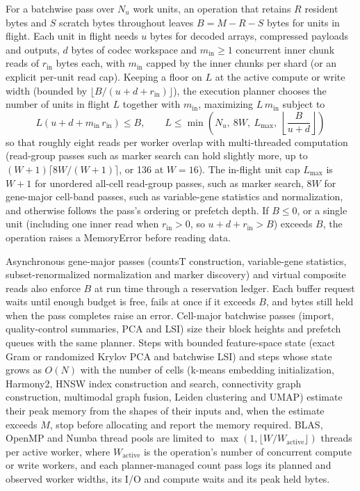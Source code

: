 \documentclass[11pt]{article}
\begin{document}
For a batchwise pass over $N_u$ work units, an operation that retains $R$ resident bytes and $S$ scratch bytes throughout leaves $B=M-R-S$ bytes for units in flight. Each unit in flight needs $u$ bytes for decoded arrays, compressed payloads and outputs, $d$ bytes of codec workspace and $m_{\mathrm{in}}\ge1$ concurrent inner chunk reads of $r_{\mathrm{in}}$ bytes each, with $m_{\mathrm{in}}$ capped by the inner chunks per shard (or an explicit per-unit read cap). Keeping a floor on $L$ at the active compute or write width (bounded by $\lfloor B/(u+d+r_{\mathrm{in}})\rfloor$), the execution planner chooses the number of units in flight $L$ together with $m_{\mathrm{in}}$, maximizing $L\,m_{\mathrm{in}}$ subject to
\[
L\left(u+d+m_{\mathrm{in}}\,r_{\mathrm{in}}\right)\le B,\qquad L\le\min\left(N_u,\ 8W,\ L_{\max},\ \left\lfloor\frac{B}{u+d}\right\rfloor\right)
\]
so that roughly eight reads per worker overlap with multi-threaded computation (read-group passes such as marker search can hold slightly more, up to $(W+1)\lceil 8W/(W+1)\rceil$, or 136 at $W=16$). The in-flight unit cap $L_{\max}$ is $W+1$ for unordered all-cell read-group passes, such as marker search, $8W$ for gene-major cell-band passes, such as variable-gene statistics and normalization, and otherwise follows the pass's ordering or prefetch depth. If $B\le0$, or a single unit (including one inner read when $r_{\mathrm{in}}>0$, so $u+d+r_{\mathrm{in}}>B$) exceeds $B$, the operation raises a MemoryError before reading data.

Asynchronous gene-major passes (countsT construction, variable-gene statistics, subset-renormalized normalization and marker discovery) and virtual composite reads also enforce $B$ at run time through a reservation ledger. Each buffer request waits until enough budget is free, fails at once if it exceeds $B$, and bytes still held when the pass completes raise an error. Cell-major batchwise passes (import, quality-control summaries, PCA and LSI) size their block heights and prefetch queues with the same planner. Steps with bounded feature-space state (exact Gram or randomized Krylov PCA and batchwise LSI) and steps whose state grows as $O(N)$ with the number of cells (k-means embedding initialization, Harmony2, HNSW index construction and search, connectivity graph construction, multimodal graph fusion, Leiden clustering and UMAP) estimate their peak memory from the shapes of their inputs and, when the estimate exceeds $M$, stop before allocating and report the memory required. BLAS, OpenMP and Numba thread pools are limited to $\max(1,\lfloor W/W_{\mathrm{active}}\rfloor)$ threads per active worker, where $W_{\mathrm{active}}$ is the operation's number of concurrent compute or write workers, and each planner-managed count pass logs its planned and observed worker widths, its I/O and compute waits and its peak held bytes.
\end{document}
